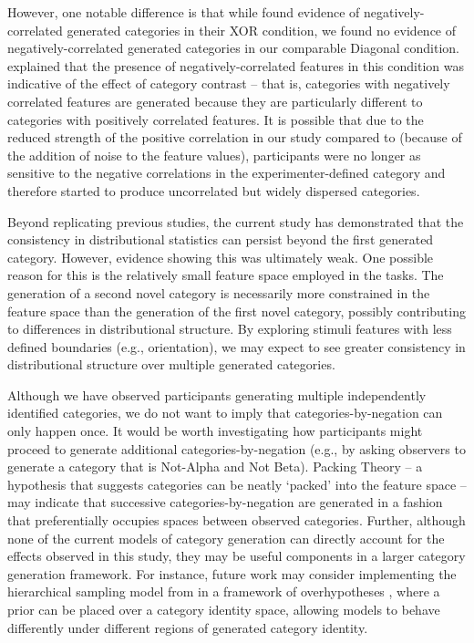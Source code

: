 \documentclass[10pt,letterpaper]{article}
\begin{document}
However, one notable difference is that while \cite{austerweil2018catgen} found evidence of negatively-correlated
generated categories in their XOR condition, we found no evidence of negatively-correlated generated categories in our
comparable Diagonal condition. \cite{austerweil2018catgen} explained that the presence of negatively-correlated features
in this condition was indicative of the effect of category contrast -- that is, categories with negatively correlated
features are generated because they are particularly different to categories with positively correlated features. It is
possible that due to the reduced strength of the positive correlation in our study compared to
\cite{austerweil2018catgen} (because of the addition of noise to the feature values), participants were no longer as
sensitive to the negative correlations in the experimenter-defined category and therefore started to produce
uncorrelated but widely dispersed categories.

Beyond replicating previous studies, the current study has demonstrated that the consistency in distributional
statistics can persist beyond the first generated category. However, evidence showing this was ultimately weak. One
possible reason for this is the relatively small feature space employed in the tasks. The generation of a second novel
category is necessarily more constrained in the feature space than the generation of the first novel category, possibly
contributing to differences in distributional structure. By exploring stimuli features with less defined boundaries
(e.g., orientation), we may expect to see greater consistency in distributional structure over multiple generated
categories.

Although we have observed participants generating multiple independently identified categories, we do not want to imply that categories-by-negation can only happen once. It would be worth investigating how participants might proceed to generate additional categories-by-negation (e.g., by asking observers to generate a category that is Not-Alpha and Not Beta). Packing Theory \citep{hidaka2011packing} -- a hypothesis that suggests categories can be neatly `packed' into the feature space -- may indicate that successive categories-by-negation are generated in a fashion that preferentially occupies spaces between observed categories. Further, although none of the current models of category generation can directly account for the effects observed in this study, they may be useful components in a larger category generation framework. For instance, future work may consider implementing the hierarchical sampling model from \cite{jern2013probabilistic} in a framework of overhypotheses \citep{kemp07}, where a prior can be placed over a category identity space, allowing models to behave differently under different regions of generated category identity.
\end{document}
